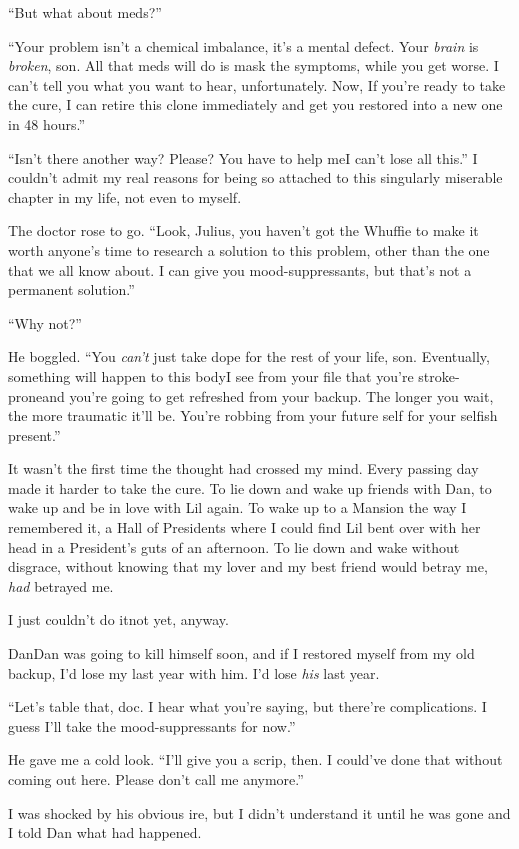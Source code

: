 “But what about meds?”

“Your problem isn't a chemical imbalance, it's a mental defect.
Your \emph{brain} is \emph{broken}, son. All that meds will do is
mask the symptoms, while you get worse. I can't tell you what you
want to hear, unfortunately. Now, If you're ready to take the cure,
I can retire this clone immediately and get you restored into a new
one in 48 hours.”

“Isn't there another way? Please? You have to help me{\dash}I can't lose
all this.” I couldn't admit my real reasons for being so attached
to this singularly miserable chapter in my life, not even to
myself.

The doctor rose to go. “Look, Julius, you haven't got the Whuffie
to make it worth anyone's time to research a solution to this
problem, other than the one that we all know about. I can give you
mood-suppressants, but that's not a permanent solution.”

“Why not?”

He boggled. “You \emph{can't} just take dope for the rest of your
life, son. Eventually, something will happen to this body{\dash}I see
from your file that you're stroke-prone{\dash}and you're going to get
refreshed from your backup. The longer you wait, the more traumatic
it'll be. You're robbing from your future self for your selfish
present.”

It wasn't the first time the thought had crossed my mind. Every
passing day made it harder to take the cure. To lie down and wake
up friends with Dan, to wake up and be in love with Lil again. To
wake up to a Mansion the way I remembered it, a Hall of Presidents
where I could find Lil bent over with her head in a President's
guts of an afternoon. To lie down and wake without disgrace,
without knowing that my lover and my best friend would betray me,
\emph{had} betrayed me.

I just couldn't do it{\dash}not yet, anyway.

Dan{\dash}Dan was going to kill himself soon, and if I restored myself
from my old backup, I'd lose my last year with him. I'd lose
\emph{his} last year.

“Let's table that, doc. I hear what you're saying, but there're
complications. I guess I'll take the mood-suppressants for now.”

He gave me a cold look. “I'll give you a scrip, then. I could've
done that without coming out here. Please don't call me anymore.”

I was shocked by his obvious ire, but I didn't understand it until
he was gone and I told Dan what had happened.

